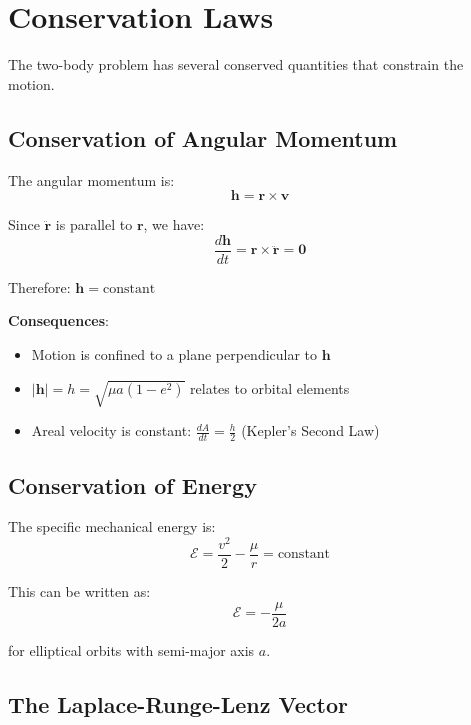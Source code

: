 \section{Conservation Laws}

The two-body problem has several conserved quantities that constrain the motion.

\subsection{Conservation of Angular Momentum}

The angular momentum is:
\begin{equation}
    \mathbf{h} = \mathbf{r} \times \mathbf{v}
\end{equation}

Since $\ddot{\mathbf{r}}$ is parallel to $\mathbf{r}$, we have:
\begin{equation}
    \frac{d\mathbf{h}}{dt} = \mathbf{r} \times \ddot{\mathbf{r}} = \mathbf{0}
\end{equation}

Therefore: $\mathbf{h} = \text{constant}$

\textbf{Consequences}:
\begin{itemize}
    \item Motion is confined to a plane perpendicular to $\mathbf{h}$
    \item $|\mathbf{h}| = h = \sqrt{\mu a(1-e^2)}$ relates to orbital elements
    \item Areal velocity is constant: $\frac{dA}{dt} = \frac{h}{2}$ (Kepler's Second Law)
\end{itemize}

\subsection{Conservation of Energy}

The specific mechanical energy is:
\begin{equation}
    \mathcal{E} = \frac{v^2}{2} - \frac{\mu}{r} = \text{constant}
\end{equation}

This can be written as:
\begin{equation}
    \mathcal{E} = -\frac{\mu}{2a}
\end{equation}

for elliptical orbits with semi-major axis $a$.

\subsection{The Laplace-Runge-Lenz Vector}

